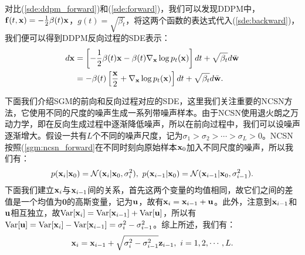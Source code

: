\documentclass[11pt,a4paper,UTF8]{ctexart}
\begin{document}
对比(\ref{sde:ddpm_forward})和(\ref{sde:forward})，我们可以发现DDPM中，$\mathbf{f}(t,\mathbf{x})=-\frac{1}{2}\beta(t)\mathbf{x}$，$g(t)=\sqrt{\beta_t}$，将这两个函数的表达式代入(\ref{sde:backward})，我们便可以得到DDPM反向过程的SDE表示：
\begin{align}
\begin{split}
    d\mathbf{x} &= \left[-\frac{1}{2}\beta(t)\mathbf{x} -\beta(t) \nabla_{\mathbf{x}} \log p_t(\mathbf{x}) \right] dt + \sqrt{\beta_t} d\bar{\mathbf{w}} \\
    &= -\beta(t) \left[\frac{\mathbf{x}}{2} + \nabla_{\mathbf{x}} \log p_t(\mathbf{x}) \right]dt + \sqrt{\beta_t} d\bar{\mathbf{w}}.
\end{split} 
\label{sde:ddpm_backward}
\end{align}

下面我们介绍SGM的前向和反向过程对应的SDE，这里我们关注重要的NCSN方法\cite{song2020score}，它使用不同的尺度的噪声生成一系列带噪声样本。由于NCSN使用退火朗之万动力学，即在反向生成过程中逐渐降低噪声，所以在前向过程中，我们可以设噪声逐渐增大。假设一共有$L$个不同的噪声尺度，记为$\sigma_1 > \sigma_2 > \cdots > \sigma_L > 0$。NCSN按照(\ref{sgm:ncsn_forward}在不同时刻向原始样本$\mathbf{x}_0$加入不同尺度的噪声，所以我们有：
\begin{equation*}
    p(\x_i|\x_0) =\N(\x_i|\x_0,\sigma_i^2),\ p(\x_{i-1}|\x_0) =\N(\x_{i-1}|\x_0,\sigma_{i-1}^2).
\end{equation*}
下面我们建立$\mathbf{x}_i$与$\mathbf{x}_{i-1}$间的关系，首先这两个变量的均值相同，故它们之间的差值是一个均值为$\mathbf{0}$的高斯变量，记为$\mathbf{u}$，故有$\mathbf{x}_i=\mathbf{x}_{i-1}+\mathbf{u}$。此外，注意到$\mathbf{x}_{i-1}$和$\mathbf{u}$相互独立，故$\text{Var}[\mathbf{x}_i]=\text{Var}[\mathbf{x}_{i-1}]+\text{Var}[\mathbf{u}]$，所以有$\text{Var}[\mathbf{u}]=\text{Var}[\mathbf{x}_i]-\text{Var}[\mathbf{x}_{i-1}]=\sigma_i^2-\sigma_{i-1}^2$。综上所述，我们有：
\begin{equation*}
    \mathbf{x}_i = \mathbf{x}_{i-1} + \sqrt{\sigma_i^2-\sigma_{i-1}^2} \mathbf{z}_{i-1},\ i=1,2,\cdots,L.
\end{equation*}
\end{document}
